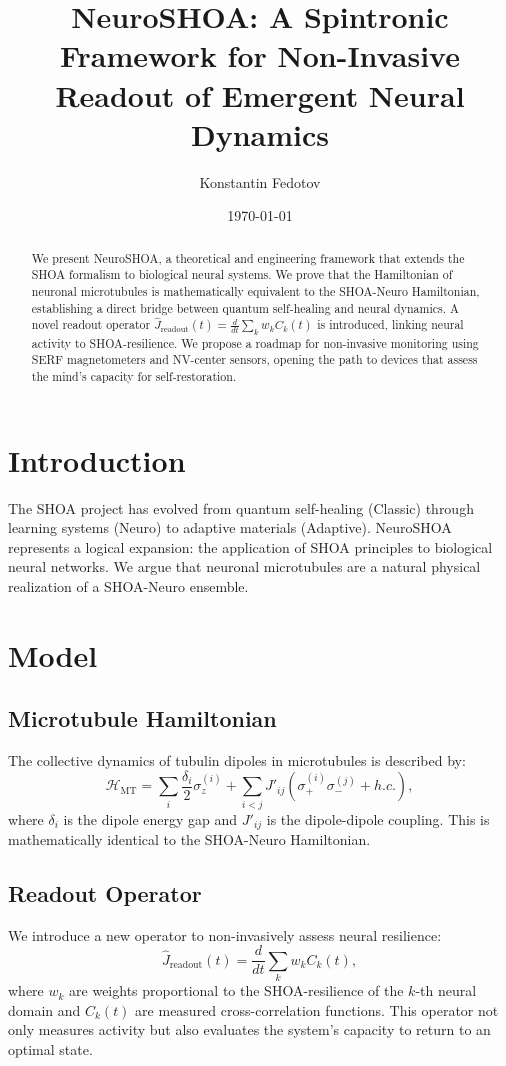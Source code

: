 \documentclass[12pt]{article}
\title{NeuroSHOA: A Spintronic Framework for Non-Invasive Readout of Emergent Neural Dynamics}
\author{Konstantin Fedotov}
\date{\today}
\begin{document}
\maketitle

\begin{abstract}
We present NeuroSHOA, a theoretical and engineering framework that extends the SHOA formalism to biological neural systems. We prove that the Hamiltonian of neuronal microtubules is mathematically equivalent to the SHOA-Neuro Hamiltonian, establishing a direct bridge between quantum self-healing and neural dynamics. A novel readout operator $\hat{J}_{\text{readout}}(t) = \frac{d}{dt} \sum_k w_k C_k(t)$ is introduced, linking neural activity to SHOA-resilience. We propose a roadmap for non-invasive monitoring using SERF magnetometers and NV-center sensors, opening the path to devices that assess the mind's capacity for self-restoration.
\end{abstract}

\section{Introduction}
The SHOA project has evolved from quantum self-healing (Classic) through learning systems (Neuro) to adaptive materials (Adaptive). NeuroSHOA represents a logical expansion: the application of SHOA principles to biological neural networks. We argue that neuronal microtubules are a natural physical realization of a SHOA-Neuro ensemble.

\section{Model}
\subsection{Microtubule Hamiltonian}
The collective dynamics of tubulin dipoles in microtubules is described by:
\begin{equation}
\mathcal{H}_{\text{MT}} = \sum_i \frac{\delta_i}{2} \sigma_z^{(i)} + \sum_{i<j} J'_{ij} (\sigma_+^{(i)} \sigma_-^{(j)} + h.c.),
\end{equation}
where $\delta_i$ is the dipole energy gap and $J'_{ij}$ is the dipole-dipole coupling. This is mathematically identical to the SHOA-Neuro Hamiltonian.

\subsection{Readout Operator}
We introduce a new operator to non-invasively assess neural resilience:
\begin{equation}
\hat{J}_{\text{readout}}(t) = \frac{d}{dt} \sum_k w_k C_k(t),
\end{equation}
where $w_k$ are weights proportional to the SHOA-resilience of the $k$-th neural domain and $C_k(t)$ are measured cross-correlation functions. This operator not only measures activity but also evaluates the system's capacity to return to an optimal state.
\end{document}

